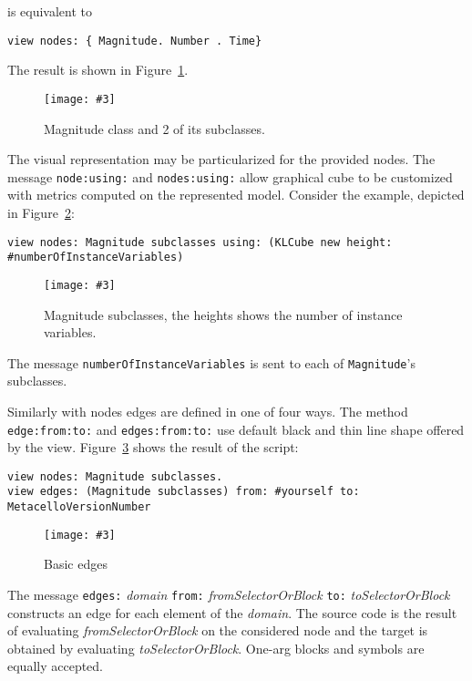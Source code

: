 \documentclass{sig-alternate}
\newcommand{\ct}{\lstinline[backgroundcolor=\color{white},basicstyle=\footnotesize\ttfamily]}
\newcommand{\rj}[1]{\nb{Ricardo}{green}{#1}}
\newcommand{\fig}[4]{
	\begin{figure}[#1]
		\centering
		\texttt{[image: \#3]}
		\caption{\label{fig:#3}#4}
	\end{figure}}
\newcommand{\figref}[1]{Figure~\ref{fig:#1}}
\begin{document}
is equivalent to

\begin{lstlisting}
view nodes: { Magnitude. Number . Time}
\end{lstlisting}

The result is shown in \figref{figure2.png}.

\fig{h}{0.2}{figure2.png}{Magnitude class and 2 of its subclasses.}

The visual representation may be particularized for the provided nodes. The message \ct{node:using:} and \ct{nodes:using:} allow graphical cube to be customized with metrics computed on the represented model. Consider the example, depicted in \figref{figure3.png}:

\begin{lstlisting}
view nodes: Magnitude subclasses using: (KLCube new height: #numberOfInstanceVariables)    
\end{lstlisting}

\fig{h}{0.3}{figure3.png}{Magnitude subclasses, the heights shows the number of instance variables.}

The message \ct{numberOfInstanceVariables} is sent to each of \ct{Magnitude}'s subclasses. 

Similarly with nodes edges are defined in one of four ways. The method \ct{edge:from:to:} and \ct{edges:from:to:} use default black and thin line shape offered by the view. \figref{figure4.png} shows the result of the script:

\begin{lstlisting}
view nodes: Magnitude subclasses.	
view edges: (Magnitude subclasses) from: #yourself to: MetacelloVersionNumber
\end{lstlisting}
\fig{h}{0.3}{figure4.png}{Basic edges}


 
 The message \ct{edges:} \emph{domain} \ct{from:} \emph{fromSelectorOrBlock} \ct{to:} \emph{toSelectorOrBlock} constructs an edge for each element of the \emph{domain}. The source code is the result of evaluating \emph{fromSelectorOrBlock} on the considered  node and the target is obtained by evaluating  \emph{toSelectorOrBlock}. One-arg blocks and symbols are equally accepted.
 
\end{document}
